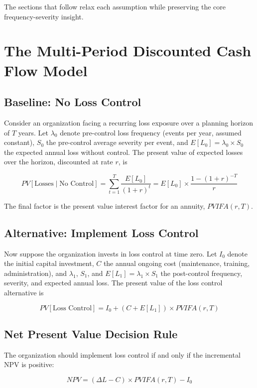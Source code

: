 \documentclass[11pt,openany]{book}
\begin{document}
The sections that follow relax each assumption while preserving the core
frequency-severity insight.

\section{The Multi-Period Discounted Cash Flow Model}
\label{sec:appendix-dcf}

\subsection{Baseline: No Loss Control}

Consider an organization facing a recurring loss exposure over a planning
horizon of \(T\) years. Let \(\lambda_0\) denote pre-control loss frequency
(events per year, assumed constant), \(S_0\) the pre-control average severity
per event, and \(E[L_0] = \lambda_0 \times S_0\) the expected annual loss
without control. The present value of expected losses over the horizon,
discounted at rate \(r\), is

\[
PV[\text{Losses} \mid \text{No Control}] =
\sum_{t=1}^{T} \frac{E[L_0]}{(1+r)^t} =
E[L_0] \times \frac{1-(1+r)^{-T}}{r}
\]

The final factor is the present value interest factor for an annuity,
\(PVIFA(r,T)\).

\subsection{Alternative: Implement Loss Control}

Now suppose the organization invests in loss control at time zero. Let \(I_0\)
denote the initial capital investment, \(C\) the annual ongoing cost
(maintenance, training, administration), and \(\lambda_1\), \(S_1\), and
\(E[L_1] = \lambda_1 \times S_1\) the post-control frequency, severity, and
expected annual loss. The present value of the loss control alternative is

\[
PV[\text{Loss Control}] = I_0 + (C + E[L_1]) \times PVIFA(r,T)
\]

\subsection{Net Present Value Decision Rule}

The organization should implement loss control if and only if the incremental
NPV is positive:

\begin{equation}
\label{eq:loss-control-npv}
NPV = (\Delta L - C) \times PVIFA(r,T) - I_0
\end{equation}
\end{document}
